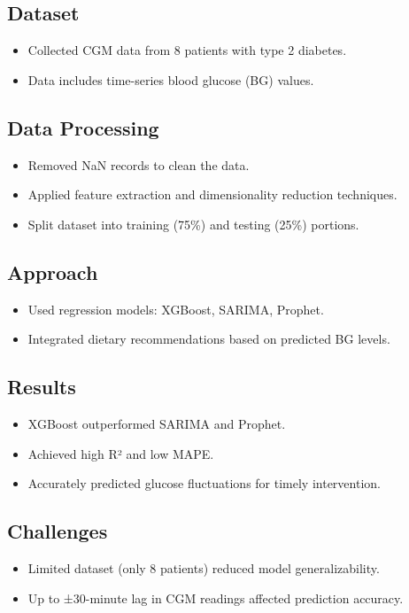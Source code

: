 \subsection*{Dataset}
\begin{itemize}
    \item Collected CGM data from 8 patients with type 2 diabetes.
    \item Data includes time-series blood glucose (BG) values.
\end{itemize}

\subsection*{Data Processing}
\begin{itemize}
    \item Removed NaN records to clean the data.
    \item Applied feature extraction and dimensionality reduction techniques.
    \item Split dataset into training (75\%) and testing (25\%) portions.
\end{itemize}

\subsection*{Approach}
\begin{itemize}
    \item Used regression models: XGBoost, SARIMA, Prophet.
    \item Integrated dietary recommendations based on predicted BG levels.
\end{itemize}

\subsection*{Results}
\begin{itemize}
    \item XGBoost outperformed SARIMA and Prophet.
    \item Achieved high R² and low MAPE.
    \item Accurately predicted glucose fluctuations for timely intervention.
\end{itemize}

\subsection*{Challenges}
\begin{itemize}
    \item Limited dataset (only 8 patients) reduced model generalizability.
    \item Up to ±30-minute lag in CGM readings affected prediction accuracy.
\end{itemize}

